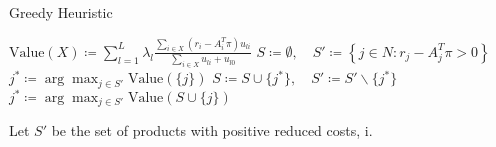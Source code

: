 \begin{algorithm}
	\caption{Greedy Heuristic}\label{alg-GreedyHeuristic}
	\begin{algorithmic}[1] %
		\State $\text{Value}(X) \coloneqq \sum_{l=1}^{L} \lambda_l \frac{\sum_{i \in X}(r_i - A_i^T\pi)u_{li}}{\sum_{i \in X}u_{li} + u_{l0}}$
		\State $S\coloneqq \emptyset,\quad S' \coloneqq \left\{j \in N : r_j - A_j^T\pi > 0\right\}$ \label{alg-L1}
		\State $j^* \coloneqq \arg\max_{j \in S'} \text{Value}(\{j\})$
		\Repeat
		\State $S \coloneqq S \cup \{j^*\},\quad S' \coloneqq S'\backslash\{j^*\}$
		\State $j^* \coloneqq \arg \max_{j \in S'} \text{Value}(S \cup \{j\})$
	\end{algorithmic}
\end{algorithm}

Let $S'$ be the set of products with positive reduced costs, i. 